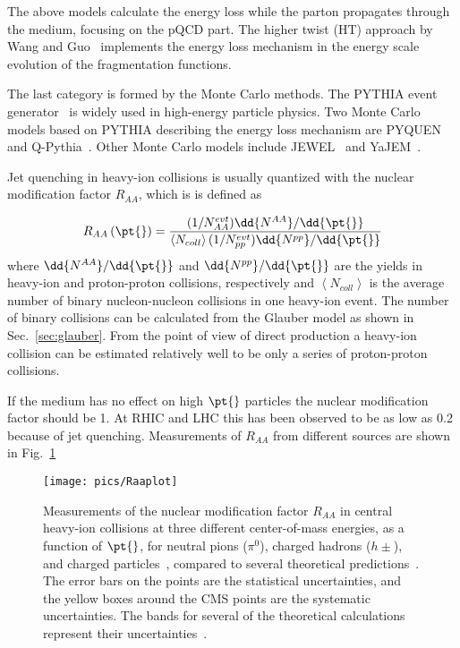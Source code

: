 The above models calculate the energy loss while the parton propagates through the medium, focusing on the pQCD part. The higher twist (HT) approach by Wang and Guo~\cite{Wang:2001ifa} implements the energy loss mechanism in the energy scale evolution of the fragmentation functions.

The last category is formed by the Monte Carlo methods. The PYTHIA event generator~\cite{pythia} is widely used in high-energy particle physics. Two Monte Carlo models based on PYTHIA describing the energy loss mechanism are PYQUEN~\cite{Lokhtin:2005px} and Q-Pythia~\cite{Armesto:2009zc}. Other Monte Carlo models include JEWEL~\cite{Zapp:2008gi} and YaJEM~\cite{Renk:2009nz}.

Jet quenching in heavy-ion collisions is usually quantized with the nuclear modification factor $R_{AA}$, which is  is defined as

\begin{equation}
R_{AA}\left(\pt{}\right) = \frac{(1/N_{AA}^{evt})\dd {N^{AA}}/\dd {\pt{}}}{\left< N_{coll}\right> (1/N_{pp}^{evt})\dd {N^{pp}}/\dd {\pt{}}}\label{eq:raa}
\end{equation}
\noindent where $\dd{N^{AA}}/\dd{\pt{}}$ and $\dd{N^{pp}}/\dd{\pt{}}$ are the yields in heavy-ion and proton-proton collisions, respectively and $\left< N_{coll}\right>$ is the average number of binary nucleon-nucleon collisions in one heavy-ion event. The number of binary collisions can be calculated from the Glauber model as shown in Sec.~\ref{sec:glauber}. From the point of view of direct production a heavy-ion collision can be estimated relatively well to be only a series of proton-proton collisions. 

If the medium has no effect on high $\pt{}$ particles the nuclear modification factor should be 1. At RHIC and LHC this has been observed to be as low as 0.2 because of jet quenching. Measurements of $R_{AA}$ from different sources are shown in Fig.~\ref{fig:Raa}

\begin{figure}[hbt]
	\centering
                \texttt{[image: pics/Raaplot]}
        \caption[Measurements of the nuclear modification factor $R_{AA}$ in central heavy-ion collisions]{Measurements of the nuclear modification factor $R_{AA}$ in central heavy-ion collisions at three different center-of-mass energies, as a function of $\pt{}$, for neutral pions ($\pi^0$), charged hadrons ($h\pm$), and charged particles~\cite{Aamodt:2010jd, Aggarwal:2001gn, d'Enterria:2004ig, Adare:2008qa, Adams:2003kv}, compared to several theoretical predictions~\cite{Dainese:2004te, Vitev:2002pf, Vitev:2004bh, Salgado:2003gb, Armesto:2005iq, Renk:2011gj}. The error bars on the points are the statistical uncertainties, and the yellow boxes around the CMS points are the systematic uncertainties. The bands for several of the theoretical calculations represent their uncertainties~\cite{CMS:2012aa}.}
        \label{fig:Raa}
\end{figure}


